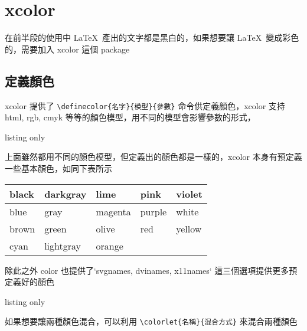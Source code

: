 \chapter{xcolor}

在前半段的使用中 \LaTeX\ 產出的文字都是黑白的，如果想要讓 \LaTeX\ 變成彩色的，需要加入 xcolor 這個 package

\section{定義顏色}

xcolor 提供了 \verb|\definecolor{名字}{模型}{參數}| 命令供定義顏色，xcolor 支持 html, rgb, cmyk 等等的顏色模型，用不同的模型會影響參數的形式，

\begin{tcblisting}{listing only}
\end{tcblisting}

上面雖然都用不同的顏色模型，但定義出的顏色都是一樣的，xcolor 本身有預定義一些基本顏色，如同下表所示

\begin{table}[htp]
\newcommand{\showcolor}[1]{\colorbox{#1}{\hspace{12pt}}#1 \hskip3pt}
\centering
\begin{tabular}{lllll}
\hline
\showcolor{black} & \showcolor{darkgray} & \showcolor{lime} & \showcolor{pink} & \showcolor{violet} \\\hline
\showcolor{blue} & \showcolor{gray} & \showcolor{magenta} & \showcolor{purple} & \showcolor{white} \\\hline
\showcolor{brown} & \showcolor{green} & \showcolor{olive} & \showcolor{red} & \showcolor{yellow} \\\hline
\showcolor{cyan} & \showcolor{lightgray} & \showcolor{orange} &  &  \\\hline
\end{tabular}
\end{table}


除此之外 color 也提供了`svgnames, dvinames, x11names` 這三個選項提供更多預定義好的顏色

\begin{tcblisting}{listing only}
\usepackage[svgnames]{xcolor}
\usepackage[dvinames]{xcolor}
\usepackage[x11names]{xcolor}
\end{tcblisting}

如果想要讓兩種顏色混合，可以利用 \verb|\colorlet{名稱}{混合方式}| 來混合兩種顏色



